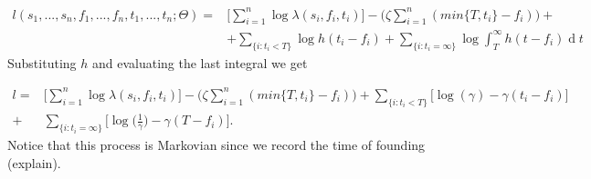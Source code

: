 \documentclass[11pt,a4paper]{article}
\renewcommand{\d}[1]{\ensuremath{\operatorname{d}\!{#1}}}
\begin{document}
\[
\begin{aligned}
l(s_{1}, ..., s_{n}, f_{1}, ..., f_{n}, t_{1}, ..., t_{n} ; \Theta) = & \Bigg[ \sum_{i = 1}^{n} \log \lambda(s_{i},f_{i}, t_{i}) \Bigg] - \bigg(\zeta \sum_{i=1}^{n} (min\{ T, t_i \} - f_i) \bigg)  + \\
& + \sum_{\{ i : t_{i} < T \} }  \log h (t_{i} - f_{i}) + \sum_{ \{ i : t_{i} = \infty \} } \log \int_{T}^{\infty} h(t - f_{i}) \d t
\end{aligned}
\]
Substituting $h$ and evaluating the last integral we get 

\[
\begin{aligned}
l = & \Bigg[ \sum_{i = 1}^{n} \log \lambda(s_{i},f_{i}, t_{i}) \Bigg] - \bigg(\zeta \sum_{i=1}^{n} (min\{ T, t_i \} - f_i) \bigg)  + \sum_{\{ i : t_{i} < T \} }  \bigg[\log (\gamma) -\gamma(t_{i} - f_{i}) \bigg] \\
+ & \sum_{ \{ i : t_{i} = \infty \} } \bigg[\log \bigg(\frac{1}{\gamma}\bigg) -\gamma(T - f_{i}) \bigg].
\end{aligned}
\]
{\color{red} Notice that this process is Markovian since we record the time of founding (explain)}.
\end{document}
